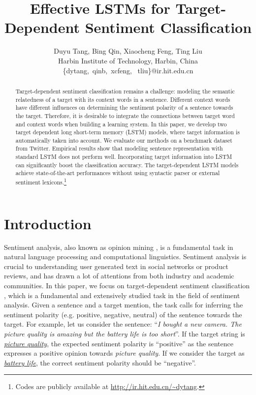 \documentclass[11pt]{article}
\title{Effective LSTMs for Target-Dependent Sentiment Classification}
\author{Duyu Tang, Bing Qin, Xiaocheng Feng,  Ting Liu\\
	Harbin Institute of Technology, Harbin, China\\
	\{dytang,\ qinb,\ xcfeng, \ tliu\}@ir.hit.edu.cn}
\date{}
\begin{document}
\maketitle
\begin{abstract}
  Target-dependent sentiment classification remains a challenge: modeling the semantic relatedness of a target with its context words in a sentence.
  Different context words have different influences on determining the sentiment polarity of a sentence towards the target.
  Therefore, it is desirable to integrate the connections between target word and context words when building a learning system.
  In this paper, we develop two target dependent long short-term memory (LSTM) models, where target information is automatically taken into account.
  We evaluate our methods on a benchmark dataset from Twitter.
  Empirical results show that modeling sentence representation with standard LSTM does not perform well.
  Incorporating target information into LSTM can significantly boost the classification accuracy.
  The target-dependent LSTM models achieve state-of-the-art performances without using syntactic parser or external sentiment lexicons.\footnote{Codes are publicly available at \url{http://ir.hit.edu.cn/~dytang}.}
\end{abstract}



\section{Introduction}


Sentiment analysis, also known as opinion mining \cite{Pang2008,Liu2012a}, is a fundamental task in natural language processing and computational linguistics. Sentiment analysis is crucial to understanding user generated text in social networks or product reviews, and has drawn a lot of attentions from both industry and academic communities. 
In this paper, we focus on target-dependent sentiment classification \cite{Jiang2011,Dong2014a,Vo2015}, which is a fundamental and extensively studied task in the field of sentiment analysis. 
Given a sentence and a target mention, the task calls for inferring the sentiment polarity (e.g. positive, negative, neutral) of the sentence towards the target. For example, let us consider the sentence: ``\textit{I bought a new camera. The {picture quality} is amazing but the {battery life} is too short}''. If the target string is \textit{\underline{picture quality}}, the expected sentiment polarity is ``positive'' as the sentence expresses a positive opinion towards \textit{picture quality}. If we consider the target as \textit{\underline{battery life}}, the correct sentiment polarity should be ``negative''.
\end{document}
